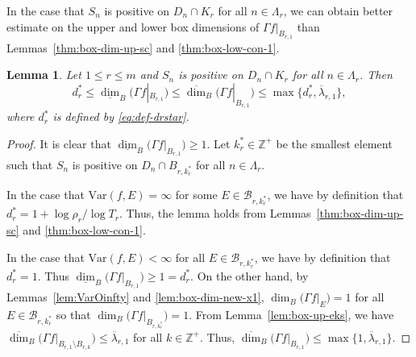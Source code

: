 \documentclass[11pt]{amsart}
\newtheorem{lem}[thm]{Lemma}
\theoremstyle{definition}
\theoremstyle{remark}
\numberwithin{equation}{section}
\newcommand{\Z}{{\mathbb Z}}
\newcommand{\mB}{{\mathcal B}}
\newcommand{\uplam}{{\overline{\lambda}}}
\newcommand{\uprho}{{{\rho}}}
\newcommand{\Var}{\mathrm{Var}}
\def\updimB{\overline{\dim}_B}
\def\lowdimB{\underline{\dim}_B}
\begin{document}
In the case that $S_n$ is positive on $D_n \cap K_r$ for all $n \in \Lambda_r$, we can obtain better estimate on the upper and lower box dimensions of $\Gamma f|_{B_{r,1}}$ than Lemmas~\ref{thm:box-dim-up-sc} and \ref{thm:box-low-con-1}.
\begin{lem}\label{lem:6.1}
	Let $1 \leq r \leq m$ and $S_n$ is positive on $D_n \cap K_r$ for all $n \in \Lambda_r$. Then
	\begin{equation*}%
		d_r^* \leq
		\lowdimB \big(\Gamma f|_{B_{r,1}} \big)  \leq
		\updimB \big(\Gamma f|_{B_{r,1}} \big)  \leq\max \{ d_r^*, \uplam_{r,1}  \},
	\end{equation*}
	where $d_r^*$ is defined by \eqref{eq:def-drstar}. 
\end{lem}

\begin{proof}
	It is clear that $	\lowdimB \big(\Gamma f|_{B_{r,1}} \big)  \geq 1$.
	Let $k_r^* \in \Z^+$ be the smallest element such that $S_n$ is positive on $D_n \cap B_{r,k_r^*}$ for all $n \in \Lambda_r$.
	
	In the case that $\Var(f,E)=\infty$ for some $E \in \mB_{r,k_r^*}$, we have by definition that $d_r^*=1+\log\uprho_r / \log T_r$.
	Thus, the lemma holds from Lemmas~\ref{thm:box-dim-up-sc} and \ref{thm:box-low-con-1}.
	
	In the case that $\Var(f,E)< \infty$ for all $E \in \mB_{r,k_r^*}$, we have by definition that $d_r^*=1$. Thus $\lowdimB \big(\Gamma f|_{B_{r,1}}\big)\geq 1=d_r^*$. On the other hand, by Lemmas~\ref{lem:VarOinfty} and \ref{lem:box-dim-new-x1}, $\dim_B \big(\Gamma f|_E\big)=1$ for all $E\in \mB_{r,k_r^*}$ so that $\dim_B \big(\Gamma f|_{B_{r,k_r^*}}\big)=1$.
	From Lemma~\ref{lem:box-up-eks}, we have
	$
	\updimB\big(\Gamma f|_{ B_{r,1} \setminus B_{r,k}}\big) 		\leq \uplam_{r,1}
	$
	for all $k \in \Z^+$. Thus, 
	$
	\updimB\big(\Gamma f|_{ B_{r,1}} \big) 		\leq \max \{ 1,\uplam_{r,1} \}.
	$
\end{proof}
\end{document}
